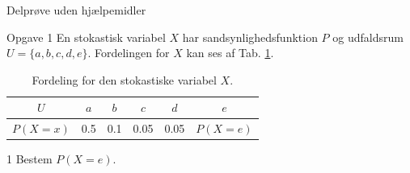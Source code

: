 \begin{center}
\LARGE
Delprøve uden hjælpemidler 
\end{center}
\begin{opgavetekst}{Opgave 1}
	En stokastisk variabel $X$ har sandsynlighedsfunktion $P$ og udfaldsrum  \\
	$U = \{a,b,c,d,e\}$. Fordelingen for $X$ 
	kan ses af Tab. \ref{tab:fordeling}.
	\begin{table}[H]
		\centering
		\begin{tabular}{c|c|c|c|c|c}
			$U$ & $a$ & $b$ &  $c$ & $d$ & $e$ \\
			\hline
			$P(X=x)$ & 0.5 & 0.1 & 0.05 & 0.05 & $P(X=e)$
		\end{tabular}
		\caption{Fordeling for den stokastiske variabel $X$. }
		\label{tab:fordeling}		
	\end{table}
	\phantom{h}
\end{opgavetekst}
	\begin{delopgave}{}{1}
		Bestem $P(X=e)$.
	\end{delopgave}

